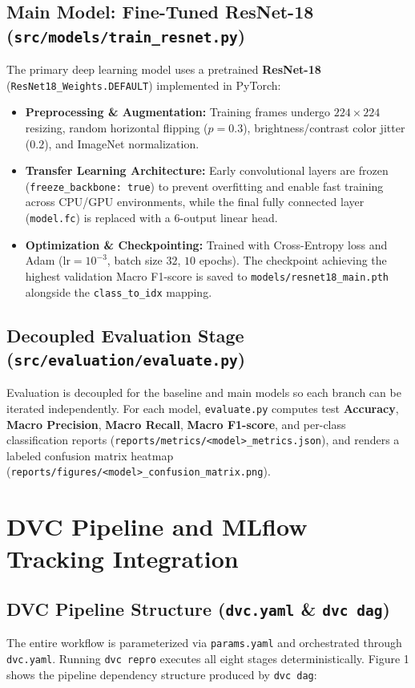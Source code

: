 \documentclass[10pt,a4paper]{article}
\begin{document}
\subsection{Main Model: Fine-Tuned ResNet-18 (\texttt{src/models/train\_resnet.py})}
The primary deep learning model uses a pretrained \textbf{ResNet-18} (\texttt{ResNet18\_Weights.DEFAULT}) implemented in PyTorch:
\begin{itemize}
    \item \textbf{Preprocessing \& Augmentation:} Training frames undergo $224 \times 224$ resizing, random horizontal flipping ($p=0.3$), brightness/contrast color jitter ($0.2$), and ImageNet normalization.
    \item \textbf{Transfer Learning Architecture:} Early convolutional layers are frozen (\texttt{freeze\_backbone: true}) to prevent overfitting and enable fast training across CPU/GPU environments, while the final fully connected layer (\texttt{model.fc}) is replaced with a 6-output linear head.
    \item \textbf{Optimization \& Checkpointing:} Trained with Cross-Entropy loss and Adam ($\mathrm{lr}=10^{-3}$, batch size $32$, $10$ epochs). The checkpoint achieving the highest validation Macro F1-score is saved to \texttt{models/resnet18\_main.pth} alongside the \texttt{class\_to\_idx} mapping.
\end{itemize}

\subsection{Decoupled Evaluation Stage (\texttt{src/evaluation/evaluate.py})}
Evaluation is decoupled for the baseline and main models so each branch can be iterated independently. For each model, \texttt{evaluate.py} computes test \textbf{Accuracy}, \textbf{Macro Precision}, \textbf{Macro Recall}, \textbf{Macro F1-score}, and per-class classification reports (\texttt{reports/metrics/<model>\_metrics.json}), and renders a labeled confusion matrix heatmap (\texttt{reports/figures/<model>\_confusion\_matrix.png}).

\section{DVC Pipeline and MLflow Tracking Integration}

\subsection{DVC Pipeline Structure (\texttt{dvc.yaml} \& \texttt{dvc dag})}
The entire workflow is parameterized via \texttt{params.yaml} and orchestrated through \texttt{dvc.yaml}. Running \texttt{dvc repro} executes all eight stages deterministically. Figure 1 shows the pipeline dependency structure produced by \texttt{dvc dag}:
\end{document}
